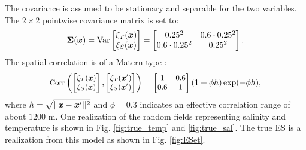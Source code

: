 \documentclass[aoas]{imsart}
\begin{document}
The covariance is assumed to be stationary and separable for the two variables. 
The $2 \times 2$ pointwise covariance matrix is set to:
\begin{equation}\label{v0}
\bSigma(\bx)=\mbox{Var} 
\begin{bmatrix}
    \xi_T(\bx) \\
    \xi_S(\bx) 
    \end{bmatrix}=
\begin{bmatrix}
0.25^2 & 0.6 \cdot 0.25^2 \\
0.6 \cdot 0.25^2 & 0.25^2
\end{bmatrix}.
\end{equation}
The spatial correlation is of a Matern type :
\begin{equation}\label{v}
\small
\mbox{Corr} 
\left(
\begin{bmatrix}
    \xi_T(\bx) \\
    \xi_S(\bx) 
    \end{bmatrix},
    \begin{bmatrix}
    \xi_T(\bx') \\
    \xi_S(\bx') 
    \end{bmatrix}
    \right)
    = \begin{bmatrix}
1 & 0.6  \\
0.6  & 1
\end{bmatrix}(1+\phi h)\exp (-\phi h),
\end{equation}
where $h=\sqrt{||{\boldsymbol x}-{\boldsymbol x}'||^2}$ and $\phi=0.3$ indicates an effective correlation range of about $1200$ m. 
One realization of the random fields representing salinity and
temperature is shown in Fig. \ref{fig:true_temp} and
\ref{fig:true_sal}. The true ES is a realization from this model as shown
in Fig. \ref{fig:ESet}.
\end{document}
